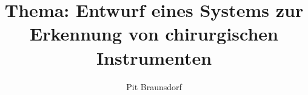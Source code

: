 \documentclass[12pt,a4paper]{scrreprt}
\author{Pit Braunsdorf}
\title{Thema: Entwurf eines Systems zur Erkennung von chirurgischen Instrumenten}
\begin{document}
	
	\tableofcontents
	
	\listoftodos
	
	
	
	
	
\end{document}
